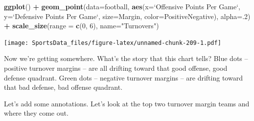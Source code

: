 \documentclass[]{book}
\newenvironment{Shaded}{\begin{snugshade}}{\end{snugshade}}
\newcommand{\DataTypeTok}[1]{\textcolor[rgb]{0.13,0.29,0.53}{#1}}
\newcommand{\DecValTok}[1]{\textcolor[rgb]{0.00,0.00,0.81}{#1}}
\newcommand{\KeywordTok}[1]{\textcolor[rgb]{0.13,0.29,0.53}{\textbf{#1}}}
\newcommand{\NormalTok}[1]{#1}
\newcommand{\OperatorTok}[1]{\textcolor[rgb]{0.81,0.36,0.00}{\textbf{#1}}}
\newcommand{\StringTok}[1]{\textcolor[rgb]{0.31,0.60,0.02}{#1}}
\begin{document}
\begin{Shaded}
\begin{Highlighting}[]
\KeywordTok{ggplot}\NormalTok{() }\OperatorTok{+}\StringTok{ }\KeywordTok{geom_point}\NormalTok{(}\DataTypeTok{data=}\NormalTok{football, }\KeywordTok{aes}\NormalTok{(}\DataTypeTok{x=}\StringTok{`}\DataTypeTok{Offensive Points Per Game}\StringTok{`}\NormalTok{, }\DataTypeTok{y=}\StringTok{`}\DataTypeTok{Defensive Points Per Game}\StringTok{`}\NormalTok{, }\DataTypeTok{size=}\NormalTok{Margin, }\DataTypeTok{color=}\NormalTok{PositiveNegative), }\DataTypeTok{alpha=}\NormalTok{.}\DecValTok{2}\NormalTok{) }\OperatorTok{+}\StringTok{ }\KeywordTok{scale_size}\NormalTok{(}\DataTypeTok{range =} \KeywordTok{c}\NormalTok{(}\DecValTok{0}\NormalTok{, }\DecValTok{6}\NormalTok{), }\DataTypeTok{name=}\StringTok{"Turnovers"}\NormalTok{)}
\end{Highlighting}
\end{Shaded}

\texttt{[image: SportsData\_files/figure-latex/unnamed-chunk-209-1.pdf]}

Now we're getting somewhere. What's the story that this chart tells? Blue dots -- positive turnover margins -- are all drifting toward that good offense, good defense quadrant. Green dots -- negative turnover margins -- are drifting toward that bad defense, bad offense quadrant.

Let's add some annotations. Let's look at the top two turnover margin teams and where they come out.

\begin{Shaded}
\end{Shaded}
\end{document}
